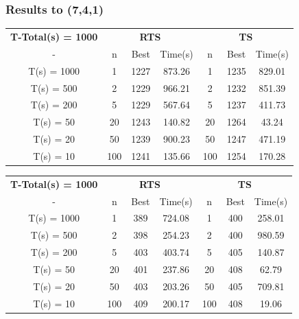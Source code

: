\documentclass{beamer}
\begin{document}
\begin{frame}
  \frametitle{Results to (7,4,1)}
{
\tiny

\begin{table}
\begin{tabular}{c|c|c|c|c|c|c}  
\addlinespace
  \toprule
\multicolumn{7}{c}{{\bf $K_{4}(7,1) \leq 992$}} \\
 \midrule
\textbf{T-Total(s) = 1000} & \multicolumn{3}{|c}{\textbf{RTS}} & \multicolumn{3}{|c}{\textbf{TS}} \\
 \midrule 
-        & n & Best & Time(s) & n & Best & Time(s) \\
 \midrule 
T(s) = 1000 & 1 & 1227    & 873.26        & 1 & 1235    & 829.01       \\
T(s) = 500 & 2 & 1229    & 966.21        & 2  & 1232    & 851.39      \\
T(s) = 200 & 5 & 1229    & 567.64       & 5    & 1237    & 411.73     \\
T(s) = 50 & 20  & 1243    & 140.82        & 20  & 1264    & 43.24      \\
T(s) = 20 & 50  & 1239    & 900.23       & 50   & 1247    & 471.19   \\
T(s) = 10 & 100 & 1241    & 135.66       & 100   & 1254    & 170.28      \\
\bottomrule  
\end{tabular}
\label{tabela-K(741)}
\end{table}


\begin{table}
\begin{tabular}{c|c|c|c|c|c|c}  
\addlinespace
  \toprule
\multicolumn{7}{c}{{\bf $c_{4}(7,1) \leq 341$}} \\
 \midrule
\textbf{T-Total(s) = 1000} & \multicolumn{3}{|c}{\textbf{RTS}} & \multicolumn{3}{|c}{\textbf{TS}} \\
 \midrule 
-        & n & Best & Time(s) & n & Best & Time(s) \\
 \midrule 
T(s) = 1000 & 1  & 389    & 724.08       & 1   & 400    & 258.01     \\
T(s) = 500 & 2 & 398    & 254.23       & 2     & 400    & 980.59    \\
T(s) = 200 & 5  & 403    & 403.74       & 5   & 405    & 140.87     \\
T(s) = 50 & 20  & 401    & 237.86       & 20   & 408    & 62.79     \\
T(s) = 20 & 50 & 403    & 203.26       & 50     & 405    & 709.81    \\
T(s) = 10 & 100 & 409    & 200.17       & 100  & 408    & 19.06       \\
\bottomrule  
\end{tabular}
\label{tabela-c(741)}
\end{table}

}
\end{frame}
\end{document}
